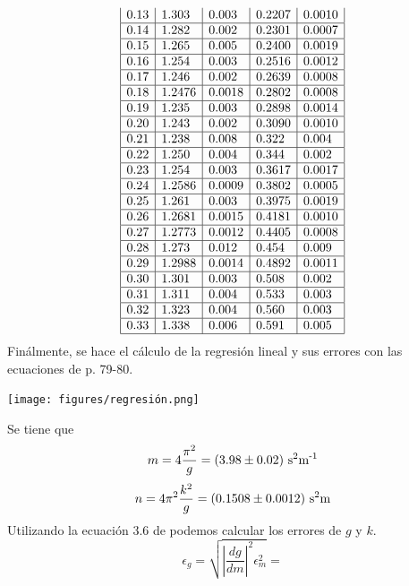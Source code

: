 \documentclass{article}
\begin{document}
\begin{multicols}{2}
$$\begin{array}{|l|l|l|l|l|}
    0.13 & 1.303 & 0.003 & 0.2207 & 0.0010  \\ \hline
    0.14 & 1.282 & 0.002 & 0.2301 & 0.0007  \\ \hline
    0.15 & 1.265 & 0.005 & 0.2400 & 0.0019  \\ \hline
    0.16 & 1.254 & 0.003 & 0.2516 & 0.0012  \\ \hline
    0.17 & 1.246 & 0.002 & 0.2639 & 0.0008  \\ \hline
    0.18 & 1.2476 & 0.0018 & 0.2802 & 0.0008  \\ \hline
    0.19 & 1.235 & 0.003 & 0.2898 & 0.0014  \\ \hline
    0.20 & 1.243 & 0.002 & 0.3090 & 0.0010  \\ \hline
    0.21 & 1.238 & 0.008 & 0.322 & 0.004  \\ \hline
    0.22 & 1.250 & 0.004 & 0.344 & 0.002  \\ \hline
    0.23 & 1.254 & 0.003 & 0.3617 & 0.0017  \\ \hline
    0.24 & 1.2586 & 0.0009 & 0.3802 & 0.0005  \\ \hline
    0.25 & 1.261 & 0.003 & 0.3975 & 0.0019  \\ \hline
    0.26 & 1.2681 & 0.0015 & 0.4181 & 0.0010  \\ \hline
    0.27 & 1.2773 & 0.0012 & 0.4405 & 0.0008  \\ \hline
    0.28 & 1.273 & 0.012 & 0.454 & 0.009  \\ \hline
    0.29 & 1.2988 & 0.0014 & 0.4892 & 0.0011  \\ \hline
    0.30 & 1.301 & 0.003 & 0.508 & 0.002  \\ \hline
    0.31 & 1.311 & 0.004 & 0.533 & 0.003  \\ \hline
    0.32 & 1.323 & 0.004 & 0.560 & 0.003  \\ \hline
    0.33 & 1.338 & 0.006 & 0.591 & 0.005  \\ \hline
    \end{array}
$$
Finálmente, se hace el cálculo de la regresión lineal y sus errores con las ecuaciones de \cite{manual} p. 79-80.
\begin{center}
\texttt{[image: figures/regresión.png]}
\end{center}
Se tiene que
$$
m = 4\frac{\pi^2}{g} = (3.98 \pm 0.02) \text{ s\textsuperscript{2}m\textsuperscript{-1}}
$$
$$
n = 4 \pi^2 \frac{k^2}{g} = (0.1508 \pm 0.0012) \text{ s\textsuperscript{2}m}
$$
Utilizando la ecuación 3.6 de \cite{manual} podemos calcular los errores de $g$ y $k$.
$$
\epsilon_g =
\sqrt{ \left| \frac{dg}{dm} \right|^2 \epsilon_m^2 } =
$$
\end{multicols}
\end{document}

